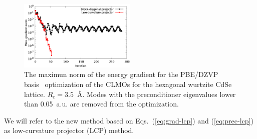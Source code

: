 \documentclass[aps,prl,twocolumn,reprint,amsmath,amssymb]{revtex4-1}
\begin{document}
\begin{figure}
\centering
\includegraphics[width=0.5\textwidth]{convergence}
\caption{The maximun norm of the energy gradient for the PBE/DZVP basis~\cite{RZK-molopt-basis-paper} optimization of the CLMOs for the hexagonal wurtzite CdSe lattice. $R_c = 3.5$~{\AA}. Modes with the preconditioner eigenvalues lower than 0.05~a.u. are removed from the optimization.} 
\label{fig:convergence}
\end{figure}

We will refer to the new method based on Eqs.~(\ref{eq:grad-lcp}) and (\ref{eq:prec-lcp}) as low-curvature projector (LCP) method.



\end{document}
